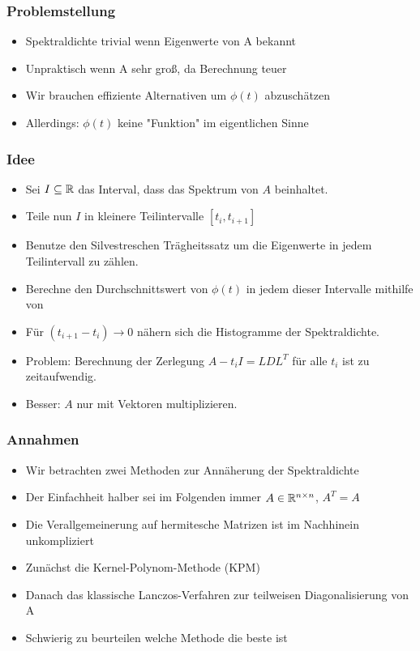 \begin{frame}
    \frametitle{Problemstellung}
    \begin{itemize}
        \item Spektraldichte trivial wenn Eigenwerte von A bekannt
        \item Unpraktisch wenn A sehr groß, da Berechnung teuer
        \item Wir brauchen effiziente Alternativen um $\phi(t)$ abzuschätzen
        \item Allerdings: $\phi(t)$ keine "Funktion" im eigentlichen Sinne
    \end{itemize}
\end{frame}

\begin{frame}
    \frametitle{Idee}
    \begin{itemize}
        \item Sei $I \subseteq \mathbb{R}$ das Interval, dass das Spektrum von $A$ beinhaltet.
        \item Teile nun $I$ in kleinere Teilintervalle $[t_i, t_{i+1}]$
        \item Benutze den Silvestreschen Trägheitssatz um die Eigenwerte in jedem Teilintervall zu zählen.
        \item Berechne den Durchschnittswert von $\phi(t)$ in jedem dieser Intervalle mithilfe von %
        \item Für $(t_{i+1} - t_i) \longrightarrow 0$ nähern sich die Histogramme der Spektraldichte.
        \item Problem: Berechnung der Zerlegung $A - t_i I = LDL^T$ für alle $t_i$ ist zu zeitaufwendig.
        \item Besser: $A$ nur mit Vektoren multiplizieren.
    \end{itemize}
\end{frame}

\begin{frame}
    \frametitle{Annahmen}
    \begin{itemize}
        \item Wir betrachten zwei Methoden zur Annäherung der Spektraldichte
        \item Der Einfachheit halber sei im Folgenden immer $A \in \mathbb{R}^{n \times n}$, $A^T = A$
        \item Die Verallgemeinerung auf hermitesche Matrizen ist im Nachhinein unkompliziert
        \item Zunächst die Kernel-Polynom-Methode (KPM)
        \item Danach das klassische Lanczos-Verfahren zur teilweisen Diagonalisierung von A
        \item Schwierig zu beurteilen welche Methode die beste ist
    \end{itemize}
\end{frame}

